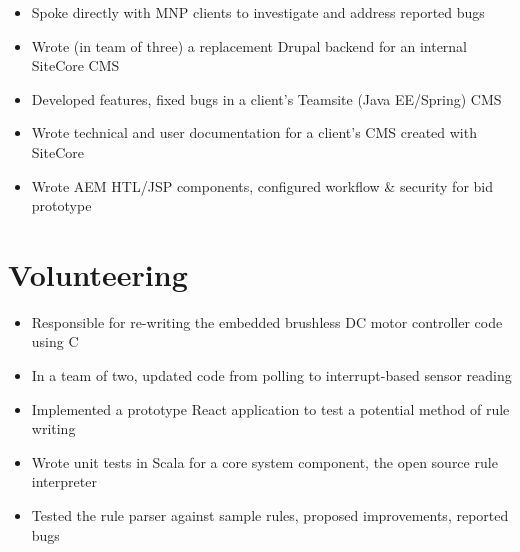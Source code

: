 \documentclass[]{rcf_cv}
\begin{document}
		\begin{itemize}
			\setlength\itemsep{-0.4em}
			\renewcommand\labelitemi{--}
			
			\item Spoke directly with MNP clients to investigate and address reported bugs
			\item Wrote (in team of three) a replacement Drupal backend for an internal SiteCore CMS
			\item Developed features, fixed bugs in a client's Teamsite (Java EE/Spring) CMS
			\item Wrote technical and user documentation for a client's CMS created with SiteCore 
			\item Wrote AEM HTL/JSP components, configured workflow \& security for bid prototype

			
		\end{itemize}
	
	\section{Volunteering}
	
		\begin{itemize}
			\setlength\itemsep{-0.4em}
			\renewcommand\labelitemi{--}
			
			\item Responsible for re-writing the embedded brushless DC motor controller code using C
			\item In a team of two, updated code from polling to interrupt-based sensor reading
			
		\end{itemize}
	
		\begin{itemize}
			\setlength\itemsep{-0.4em}
			\renewcommand\labelitemi{--}
			
			\item Implemented a prototype React application to test a potential method of rule writing
			\item Wrote unit tests in Scala for a core system component, the open source rule interpreter
			\item Tested the rule parser against sample rules, proposed improvements, reported bugs

		\end{itemize}
\end{document}

